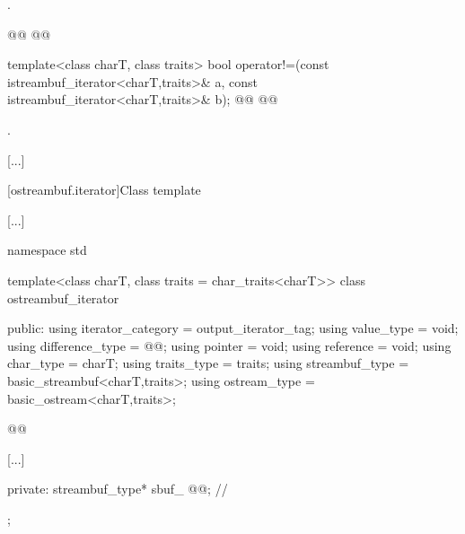 \begin{itemdescr}
\pnum
\returns
{}.
\end{itemdescr}

\begin{addedblock}
{\color{newclr}
%
\begin{itemdecl}
@@
@@
\end{itemdecl}

\begin{itemdescr}
\pnum
{}
\end{itemdescr}
} %
\end{addedblock}

%
\begin{itemdecl}
template<class charT, class traits>
  bool operator!=(const istreambuf_iterator<charT,traits>& a,
                  const istreambuf_iterator<charT,traits>& b);
@@
@@
\end{itemdecl}

\begin{itemdescr}
\pnum
\returns
{}.
\end{itemdescr}

[...]

[ostreambuf.iterator]{Class template }

[...]

%
\begin{codeblock}
namespace std {
  template<class charT, class traits = char_traits<charT>>
  class ostreambuf_iterator {
  public:
    using iterator_category = output_iterator_tag;
    using value_type        = void;
    using difference_type   = @@;
    using pointer           = void;
    using reference         = void;
    using char_type         = charT;
    using traits_type       = traits;
    using streambuf_type    = basic_streambuf<charT,traits>;
    using ostream_type      = basic_ostream<charT,traits>;

    @@

    [...]

  private:
    streambuf_type* sbuf_ @@;                // \expos
  };
}
\end{codeblock}
